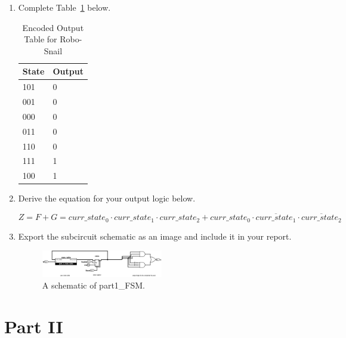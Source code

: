 \documentclass{article}
\begin{document}
\begin{enumerate}
\item Complete Table~\ref{t:part1_output_table} below.

\begin{table}[ht!]
\caption{Encoded Output Table for Robo-Snail}
\label{t:part1_output_table}
\centering
\begin{tabular}{|l|l|}
\hline
State   & Output \\ \hline
101 & 0\\ \hline
001 & 0 \\ \hline
000 & 0\\ \hline
011 & 0\\ \hline
110 & 0 \\ \hline
111 & 1 \\ \hline
100 & 1\\ \hline
\end{tabular}
\end{table}

\item Derive the equation for your output logic below.

$$Z = F + G = curr\_state_0 \cdot curr\_state_1 \cdot curr\_state_2 + curr\_state_0 \cdot \overline{curr\_state_1} \cdot \overline{curr\_state_2}$$

\item Export the subcircuit schematic as an image and include it in your report.

\begin{figure}[ht!]
    \centering
    \includegraphics[width=0.5\textwidth]{lab6_part1_output.png}
    \caption{A schematic of part1\_FSM.}
    \label{f:part1_FSM}
\end{figure}
\end{enumerate}

\clearpage
\section{Part II}
\end{document}
